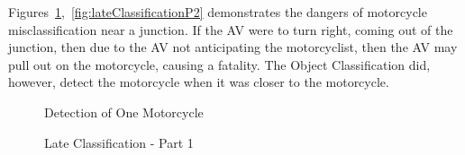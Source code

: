 \documentclass[12pt]{report} %
\begin{document}
		Figures~\ref{fig:lateClassificationP1},~\ref{fig:lateClassificationP2} demonstrates the dangers of motorcycle misclassification near a junction. If the AV were to turn right, coming out of the junction, then due to the AV not anticipating the motorcyclist, then the AV may pull out on the motorcycle, causing a fatality. The Object Classification did, however, detect the motorcycle when it was closer to the motorcycle.
		\begin{figure}[ht]
			\begin{floatrow}
				{
					\caption{Detection of One Motorcycle}
					\label{fig:detectionOfOneMotorcycle}
				}
			
				{
					\caption{Late Classification - Part 1}
					\label{fig:lateClassificationP1}
				}
			

\end{floatrow}
\end{figure}
\end{document}
